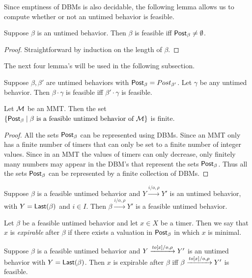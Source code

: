 Since emptiness of DBMs is also decidable, the following lemma allows us to compute whether or not an untimed behavior is feasible.

\begin{lemma}
Suppose $\beta$ is an untimed behavior. Then $\beta$ is feasible iff $\mathsf{Post}_{\beta} \neq \emptyset$.
\end{lemma}
\begin{proof}
Straightforward by induction on the length of $\beta$.
\end{proof}

The next four lemma's will be used in the following subsection.

\begin{lemma}
\label{lemma: feasibility concatenation}
Suppose $\beta, \beta'$ are untimed behaviors with
$\mathsf{Post}_{\beta} = Post_{\beta'}$. Let $\gamma$ be any untimed behavior.
Then $\beta \cdot \gamma$ is feasible iff $\beta' \cdot \gamma$ is feasible.
\end{lemma}

\begin{lemma}
\label{lemma finitely many zones}
Let ${\cal M}$ be an MMT. Then the set
$\{ \mathsf{Post}_{\beta} \mid \beta \mbox{ is a feasible untimed behavior of } {\cal M} \}$ is finite.
\end{lemma}
\begin{proof}
All the sets $\mathsf{Post}_{\beta}$ can be represented using DBMs. Since an MMT only has a finite number of timers that can only be set to a finite number of integer values. Since in an MMT the values of timers can only decrease, only finitely many numbers may
appear in the DBM's that represent the sets $\mathsf{Post}_{\beta}$. Thus all the sets $\mathsf{Post}_{\beta}$ can be represented by a finite
collection of DBMs.
\end{proof}

\begin{lemma}
Suppose $\beta$ is a feasible untimed behavior and $Y \xrightarrow{i/o, \rho} Y'$ is an untimed behavior,
with $Y = \mathsf{Last}({\beta})$ and $i \in I$.
Then $\beta \xrightarrow{i/o, \rho} Y'$ is a feasible untimed behavior.
\end{lemma}

Let $\beta$ be a feasible untimed behavior and let $x \in X$ be a timer. Then we say that $x$ is \emph{expirable} after $\beta$
if there exists a valuation in $\mathsf{Post}_{\beta}$ in which $x$ is minimal.

\begin{lemma}
Suppose $\beta$ is a feasible untimed behavior and $Y \xrightarrow{\mathit{to}[x]/o, \rho} Y'$ is an untimed behavior 
with $Y = \mathsf{Last}({\beta})$.
Then $x$ is expirable after $\beta$ iff $\beta \xrightarrow{\mathit{to}[x]/o, \rho} Y'$ is feasible.
\end{lemma}

